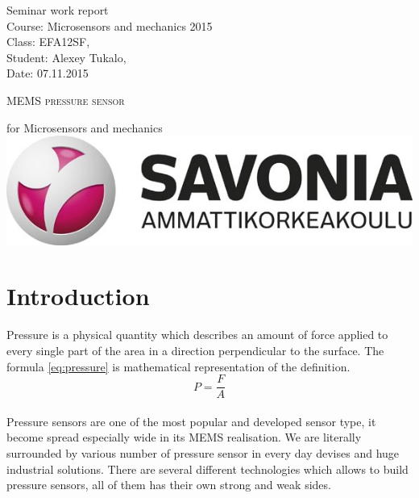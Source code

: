 \documentclass[english]{article}
\date{}
\begin{document}
\begin{titlepage}

\begin{flushleft}
Seminar work report\\
Course: Microsensors and mechanics 2015\\
Class: EFA12SF, \\
Student: Alexey Tukalo,\\
Date: 07.11.2015
\end{flushleft}

\vspace{6.5cm}
	\centering
	{\scshape\LARGE MEMS pressure sensor \par}
	\small for Microsensors and mechanics\\
	\vspace{0.5cm}
	\includegraphics{savonia.jpg}
\end{titlepage}

\tableofcontents
\setcounter{page}{0}
\newpage


\setcounter{tocdepth}{2}





\section{Introduction}

Pressure is a physical quantity which describes an amount of force applied to every single part of the area in a direction perpendicular to the surface. The formula \ref{eq:pressure} is mathematical representation of the definition. \cite{types}\\

\begin{equation} 
P = \frac{F}{A}\label{eq:pressure}
\end{equation}\\

Pressure sensors are one of the most popular and developed sensor type, it become spread especially wide in its MEMS realisation. We are literally surrounded by various number of pressure sensor in every day devises and huge industrial solutions. There are several different technologies which allows to build pressure sensors, all of them has their own strong and weak sides. \\
\end{document}
